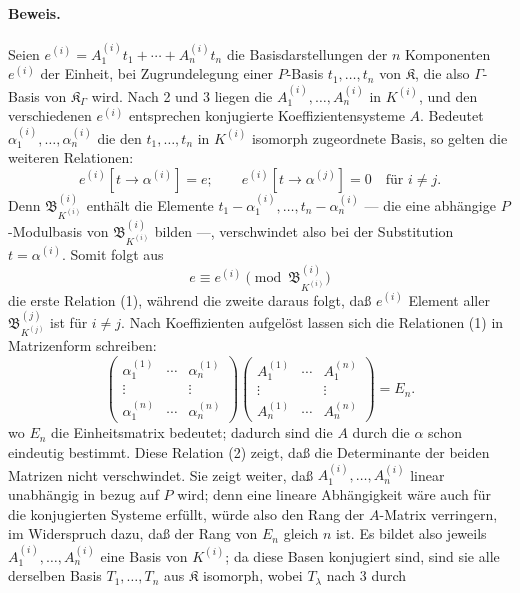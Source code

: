 \paragraph{Beweis.}
Seien $e^{(i)}=A_1^{(i)}t_1+\cdots+A_n^{(i)}t_n$ die Basisdarstellungen der $n$ Komponenten $e^{(i)}$ der Einheit, bei Zugrundelegung einer $P$-Basis $t_1,\ldots,t_n$ von $\mathfrak K$, die also $\Gamma$-Basis von $\mathfrak K_\Gamma$ wird. Nach 2 und 3 liegen die $A_1^{(i)},\ldots,A_n^{(i)}$ in $K^{(i)}$, und den verschiedenen $e^{(i)}$ entsprechen konjugierte Koeffizientensysteme $A$. Bedeutet $\alpha_1^{(i)},\ldots,\alpha_n^{(i)}$ die den $t_1,\ldots,t_n$ in $K^{(i)}$ isomorph zugeordnete Basis, so gelten die weiteren Relationen:
\begin{equation}
e^{(i)}[t\to\alpha^{(i)}]=e;
\qquad e^{(i)}[t\to\alpha^{(j)}]=0\quad\text{für }i\ne j. \tag{1}
\end{equation}
Denn $\mathfrak B_{K^{(i)}}^{(i)}$ enthält die Elemente $t_1-\alpha_1^{(i)},\ldots,t_n-\alpha_n^{(i)}$ --- die eine abhängige $P$-Modulbasis von $\mathfrak B_{K^{(i)}}^{(i)}$ bilden ---, verschwindet also bei der Substitution $t=\alpha^{(i)}$. Somit folgt aus
\[
e\equiv e^{(i)}\pmod{\mathfrak B_{K^{(i)}}^{(i)}}
\]
die erste Relation (1), während die zweite daraus folgt, daß $e^{(i)}$ Element aller $\mathfrak B_{K^{(j)}}^{(j)}$ ist für $i\ne j$. Nach Koeffizienten aufgelöst lassen sich die Relationen (1) in Matrizenform schreiben:
\begin{equation}
\begin{pmatrix}
\alpha_1^{(1)}&\cdots&\alpha_n^{(1)}\\
\vdots&&\vdots\\
\alpha_1^{(n)}&\cdots&\alpha_n^{(n)}
\end{pmatrix}
\begin{pmatrix}
A_1^{(1)}&\cdots&A_1^{(n)}\\
\vdots&&\vdots\\
A_n^{(1)}&\cdots&A_n^{(n)}
\end{pmatrix}=E_n. \tag{2}
\end{equation}
wo $E_n$ die Einheitsmatrix bedeutet; dadurch sind die $A$ durch die $\alpha$ schon eindeutig bestimmt. Diese Relation (2) zeigt, daß die Determinante der beiden Matrizen nicht verschwindet. Sie zeigt weiter, daß $A_1^{(i)},\ldots,A_n^{(i)}$ linear unabhängig in bezug auf $P$ wird; denn eine lineare Abhängigkeit wäre auch für die konjugierten Systeme erfüllt, würde also den Rang der $A$-Matrix verringern, im Widerspruch dazu, daß der Rang von $E_n$ gleich $n$ ist. Es bildet also jeweils $A_1^{(i)},\ldots,A_n^{(i)}$ eine Basis von $K^{(i)}$; da diese Basen konjugiert sind, sind sie alle derselben Basis $T_1,\ldots,T_n$ aus $\mathfrak K$ isomorph, wobei $T_\lambda$ nach 3 durch
